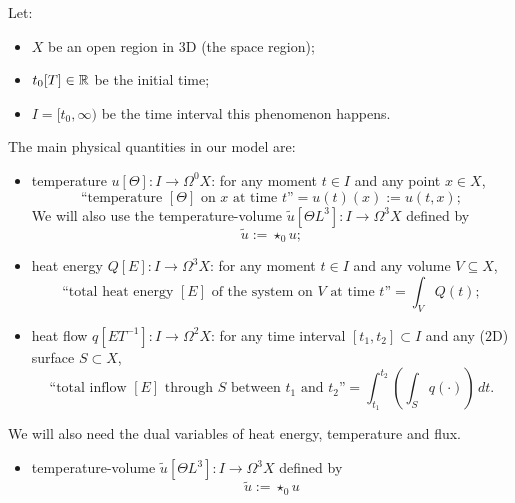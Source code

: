 \begin{discussion}
  \label{idec/heat_transport/continuous/model_with_differential_forms-discussion}
  Let:
  \begin{itemize}
    \item
      $X$ be an open region in $3$D (the space region);
    \item
      $t_0 [T] \in \mathbb{R}$ be the initial time;
    \item
      $I = [t_0, \infty)$ be the time interval this phenomenon happens.
  \end{itemize}
  The main physical quantities in our model are:
  \begin{itemize}
    \item
      temperature $u [\Theta] \colon I \to \Omega^0 X$:
      for any moment $t \in I$ and any point $x \in X$,
      \begin{equation}
        \text{``temperature $[\Theta]$ on $x$ at time $t$''}
        = u(t)(x) := u(t, x);
      \end{equation}
      We will also use the temperature-volume
      $\tilde{u} [\Theta L^3] \colon I \to \Omega^3 X$
      defined by
      \begin{equation}
        \tilde{u} := \star_0 u;
      \end{equation}
    \item
      heat energy $Q [E] \colon I \to \Omega^3 X$:
      for any moment $t \in I$ and any volume $V \subseteq X$,
      \begin{equation}
        \text{``total heat energy $[E]$ of the system on $V$ at time $t$''}
        = \int_V Q(t);
      \end{equation}
    \item
      heat flow $q [E T^{-1}] \colon I \to \Omega^2 X$:
      for any time interval $[t_1, t_2] \subset I$
      and any ($2$D) surface $S \subset X$,
      \begin{equation}
        \text{``total inflow $[E]$ through $S$ between $t_1$ and $t_2$''}
        = \int_{t_1}^{t_2} \left(\int_S q(\cdot) \right)\, d t.
      \end{equation}
  \end{itemize}
  We will also need the dual variables of heat energy, temperature and flux.
  \begin{itemize}
    \item
      temperature-volume $\tilde{u} [\Theta L^3] \colon I \to \Omega^3 X$
      defined by
      \begin{equation}
        \tilde{u} := \star_0 u

\end{equation}
\end{itemize}
\end{discussion}
